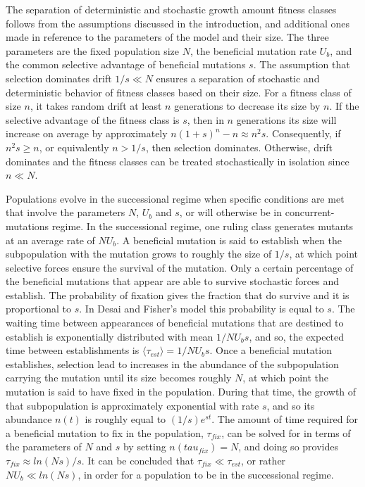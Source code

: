 \documentclass[12pt]{article}
\begin{document}
The separation of deterministic and stochastic growth amount fitness classes follows from the assumptions discussed in the introduction, and additional ones made in reference to the parameters of the model and their size.  The three parameters are the fixed population size $N$, the beneficial mutation rate $U_b$, and the common selective advantage of beneficial mutations $s$.  The assumption that selection dominates drift $1/s \ll N$ ensures a separation of stochastic and deterministic behavior of fitness classes based on their size.  For a fitness class of size $n$, it takes random drift at least $n$ generations to decrease its size by $n$.  If the selective advantage of the fitness class is $s$, then in $n$ generations its size will increase on average by approximately $n(1+s)^n-n \approx n^2s$.  Consequently, if $n^2s \ge n$, or equivalently $n>1/s$, then selection dominates.  Otherwise, drift dominates and the fitness classes can be treated stochastically in isolation since $n \ll N$.  

Populations evolve in the successional regime when specific conditions are met that involve the parameters $N$, $U_b$ and $s$, or will otherwise be in concurrent-mutations regime.  In the successional regime, one ruling class generates mutants at an average rate of $N U_b$.  A beneficial mutation is said to establish when the subpopulation with the mutation grows to roughly the size of $1/s$, at which point selective forces ensure the survival of the mutation.  Only a certain percentage of the beneficial mutations that appear are able to survive stochastic forces and establish.  The probability of fixation gives the fraction that do survive and it is proportional to $s$.  In Desai and Fisher's model this probability is equal to $s$.  The waiting time between appearances of beneficial mutations that are destined to establish is exponentially distributed with mean $1/NU_b s$, and so, the expected time between establishments is $\langle \tau_{est} \rangle = 1/NU_b s$.  Once a beneficial mutation establishes, selection lead to increases in the abundance of the subpopulation carrying the mutation until its size becomes roughly $N$, at which point the mutation is said to have fixed in the population.  During that time, the growth of that subpopulation is approximately exponential with rate $s$, and so its abundance $n(t)$ is roughly equal to $(1/s) e^{st}$.  The amount of time required for a beneficial mutation to fix in the population, $\tau_{fix}$, can be solved for in terms of the parameters of $N$ and $s$ by setting $n(tau_{fix})=N$, and doing so provides $\tau_{fix} \approx ln(Ns)/s$.  It can be concluded that $\tau_{fix} \ll \tau_{est}$, or rather $N U_b \ll ln(Ns)$, in order for a population to be in the successional regime. 
\end{document}
